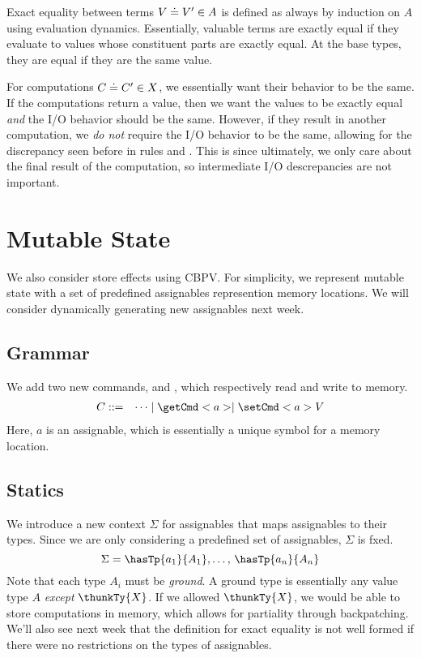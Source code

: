 \documentclass[letterpaper]{article}
\begin{document}
Exact equality between terms $V \doteq V' \in A$ is defined as always by induction on $A$ using evaluation dynamics. Essentially, valuable terms are exactly equal if they evaluate to values whose constituent parts are exactly equal. At the base types, they are equal if they are the same value.

For computations $C \doteq C' \in X$, we essentially want their behavior to be the same. If the computations return a value, then we want the values to be exactly equal \emph{and} the I/O behavior should be the same. However, if they result in another computation, we \emph{do not} require the I/O behavior to be the same, allowing for the discrepancy seen before in rules  and . This is since ultimately, we only care about the final result of the computation, so intermediate I/O descrepancies are not important.

\section{Mutable State}
We also consider store effects using CBPV. For simplicity, we represent mutable state with a set of predefined assignables represention memory locations. We will consider dynamically generating new assignables next week.

\subsection{Grammar}
We add two new commands,  and , which respectively read and write to memory.
\[
    \begin{array}{rl} 
        C ::= & \cdots \mid \getCmd<a> \mid \setCmd<a>{V}
    \end{array}
\]
Here, $a$ is an assignable, which is essentially a unique symbol for a memory location.

\subsection{Statics}
We introduce a new context $\Sigma$ for assignables that maps assignables to their types. Since we are only considering a predefined set of assignables, $\Sigma$ is fxed.
\[
  \Sigma = \hasTp{a_1}{A_1}, \ldots,\, \hasTp{a_n}{A_n}
\]
Note that each type $A_i$ must be \emph{ground}. A ground type is essentially any value type $A$ \emph{except} $\thunkTy{X}$. If we allowed $\thunkTy{X}$, we would be able to store computations in memory, which allows for partiality through backpatching. We'll also see next week that the definition for exact equality is not well formed if there were no restrictions on the types of assignables.
\end{document}
